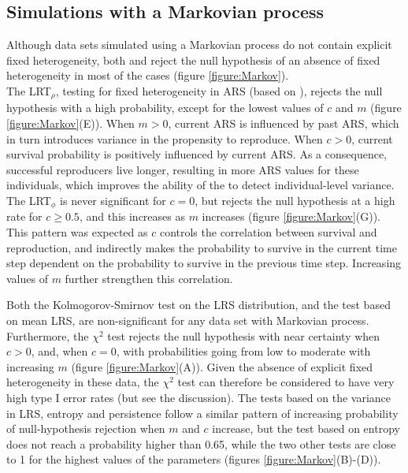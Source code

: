 \subsection{Simulations with a Markovian process}
Although data sets simulated using a Markovian process do not contain explicit fixed heterogeneity, both \MM and \NSM reject the null hypothesis of an absence of fixed heterogeneity in most of the cases (figure \ref{figure:Markov}).\\
The LRT$_\rho$, testing for fixed heterogeneity in ARS (based on \MM), rejects the null hypothesis with a high probability, except for the lowest values of $c$ and $m$ (figure \ref{figure:Markov}(E)). When $m > 0$, current ARS is influenced by past ARS, which in turn introduces variance in the propensity to reproduce. When $c > 0$, current survival probability is positively influenced by current ARS. As a consequence, successful reproducers live longer, resulting in more ARS values for these individuals, which improves the ability of the \MM to detect individual-level variance.
The LRT$_\phi$ is never significant for $c=0$, but rejects the null hypothesis at a high rate for $c \geq 0.5$, and this increases as $m$ increases (figure \ref{figure:Markov}(G)). This pattern was expected as $c$ controls the correlation between survival and reproduction, and indirectly makes the probability to survive in the current time step dependent on the probability to survive in the previous time step. Increasing values of $m$ further strengthen this correlation.

Both the Kolmogorov-Smirnov test on the LRS distribution, and the test based on mean LRS, are non-significant for any data set with Markovian process. Furthermore, the $\chi^2$ test rejects the null hypothesis with near certainty when $c>0$, and, when $c=0$, with probabilities going from low to moderate with increasing $m$ (figure \ref{figure:Markov}(A)). Given the absence of explicit fixed heterogeneity in these data, the $\chi^2$ test can therefore be considered to have very high type I error rates (but see the discussion).
The tests based on the variance in LRS, entropy and persistence follow a similar pattern of increasing probability of null-hypothesis rejection when $m$ and $c$ increase, but the test based on entropy does not reach a probability higher than 0.65, while the two other tests are close to 1 for the highest values of the parameters (figures \ref{figure:Markov}(B)-(D)). 

